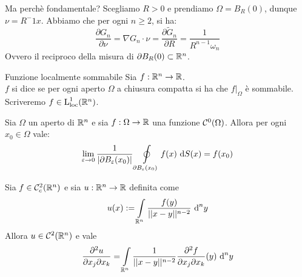 \documentclass{book}
\begin{document}
\begin{remark}{Ma perchè fondamentale?}{}
    Scegliamo $R>0$ e prendiamo $\Omega = B_R(0)$, dunque $\nu = R^-1 x$. Abbiamo che per ogni $n\ge 2$, si ha:
    \[\frac{\partial G_n}{\partial \nu} = \nabla G_n \cdot \nu = \frac{\partial \tilde{G}_n}{\partial R} =\frac{1}{R^{n-1}\omega_n}\]
    Ovvero il reciproco della misura di $\partial B_R(0)\subset \mathbb{R}^n$.
\end{remark}

\begin{definition}{Funzione localmente sommabile}{}
    Sia $f:\mathbb{R}^n \to \mathbb{R}$.\\
    $f$ si dice  se per ogni aperto $\Omega$ a chiusura compatta si ha che $f|_\Omega$ è sommabile.\\
    Scriveremo $f \in \operatorname{L}_{\text{loc}}^1(\mathbb{R}^n)$.
\end{definition}

\begin{lemma}{}{}
    Sia $\Omega$ un aperto di $\mathbb{R}^n$ e sia $f:\Omega\to\mathbb{R}$ una funzione $\mathcal{C}^0(\Omega)$. Allora per ogni $x_0 \in \Omega$ vale:
    \[\lim_{\varepsilon\to 0} \frac{1}{|\partial B_\varepsilon (x_0)|}\oint\limits_{\partial B_\varepsilon(x_0)}f(x)\text{ d} S(x) = f(x_0)\]
\end{lemma}

\begin{lemma}{}{}
    Sia $f \in \mathcal{C}^2_c(\mathbb{R}^n)$ e sia $u:\mathbb{R}^n\to\mathbb{R}$ definita come
    \[u(x) := \int\limits_{\mathbb{R}^n} \frac{f(y)}{||x-y||^{n-2}}\text{ d}^n y\]
    Allora $u\in\mathcal{C}^2(\mathbb{R}^n)$ e vale
    \[\frac{\partial^2 u}{\partial x_j \partial x_k} = \int\limits_{\mathbb{R}^n} \frac{1}{||x-y||^{n-2}}\frac{\partial^2 f}{\partial x_j\partial x_k}(y)\text{ d}^n y\]
\end{lemma}
\end{document}
